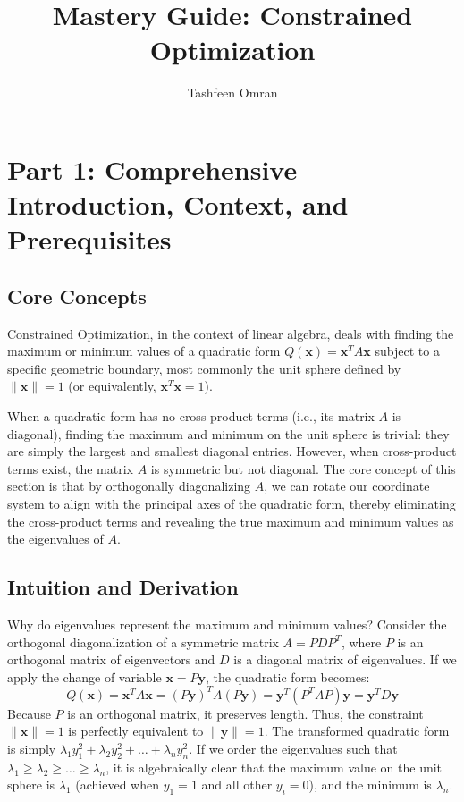 \documentclass[11pt, letterpaper]{article}
\theoremstyle{definition}
\theoremstyle{remark}
\begin{document}
\title{\textbf{Mastery Guide: Constrained Optimization}}
\author{Tashfeen Omran}
\date{}
\maketitle

\tableofcontents
\newpage

\section{Part 1: Comprehensive Introduction, Context, and Prerequisites}

\subsection{Core Concepts}
Constrained Optimization, in the context of linear algebra, deals with finding the maximum or minimum values of a quadratic form $Q(\mathbf{x}) = \mathbf{x}^T A \mathbf{x}$ subject to a specific geometric boundary, most commonly the unit sphere defined by $\|\mathbf{x}\| = 1$ (or equivalently, $\mathbf{x}^T\mathbf{x} = 1$). 

When a quadratic form has no cross-product terms (i.e., its matrix $A$ is diagonal), finding the maximum and minimum on the unit sphere is trivial: they are simply the largest and smallest diagonal entries. However, when cross-product terms exist, the matrix $A$ is symmetric but not diagonal. The core concept of this section is that by orthogonally diagonalizing $A$, we can rotate our coordinate system to align with the principal axes of the quadratic form, thereby eliminating the cross-product terms and revealing the true maximum and minimum values as the eigenvalues of $A$.

\subsection{Intuition and Derivation}
Why do eigenvalues represent the maximum and minimum values? Consider the orthogonal diagonalization of a symmetric matrix $A = P D P^T$, where $P$ is an orthogonal matrix of eigenvectors and $D$ is a diagonal matrix of eigenvalues. 
If we apply the change of variable $\mathbf{x} = P\mathbf{y}$, the quadratic form becomes:
\[ Q(\mathbf{x}) = \mathbf{x}^T A \mathbf{x} = (P\mathbf{y})^T A (P\mathbf{y}) = \mathbf{y}^T (P^T A P) \mathbf{y} = \mathbf{y}^T D \mathbf{y} \]
Because $P$ is an orthogonal matrix, it preserves length. Thus, the constraint $\|\mathbf{x}\| = 1$ is perfectly equivalent to $\|\mathbf{y}\| = 1$. The transformed quadratic form is simply $\lambda_1 y_1^2 + \lambda_2 y_2^2 + \dots + \lambda_n y_n^2$. If we order the eigenvalues such that $\lambda_1 \ge \lambda_2 \ge \dots \ge \lambda_n$, it is algebraically clear that the maximum value on the unit sphere is $\lambda_1$ (achieved when $y_1 = 1$ and all other $y_i = 0$), and the minimum is $\lambda_n$.
\end{document}
